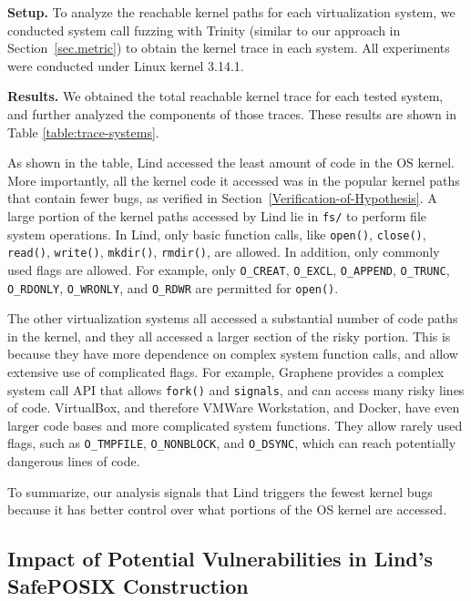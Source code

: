 {{\noindent
\textbf{Setup.}
To analyze the reachable kernel paths for each
virtualization system,
we conducted system call fuzzing with Trinity (similar to our approach in Section~{\ref{sec.metric}}) to obtain
the kernel trace in each system.
All experiments were conducted under Linux kernel 3.14.1.

\noindent
\textbf{Results.}
We obtained the total reachable kernel trace for
each tested system,
and further analyzed the components of those traces. These results
are shown in Table \ref{table:trace-systems}.

As shown in the table, Lind accessed the least amount of code in the OS
kernel. More importantly, all the kernel code it accessed was in the
popular kernel paths that contain fewer bugs,
as verified in Section~{\ref{Verification-of-Hypothesis}}.
A large portion of the kernel paths accessed by Lind lie in
\texttt{fs/} to perform file system operations.
In Lind, only basic function calls,
like \texttt{open()}, \texttt{close()}, \texttt{read()}, \texttt{write()}, \texttt{mkdir()},
\texttt{rmdir()}, are allowed. In addition, only commonly used flags are allowed. For example,
only \texttt{O\_CREAT}, \texttt{O\_EXCL}, \texttt{O\_APPEND}, \texttt{O\_TRUNC},
\texttt{O\_RDONLY}, \texttt{O\_WRONLY}, and \texttt{O\_RDWR} are permitted for \texttt{open()}.

The other virtualization systems all accessed a substantial number of code
paths in the kernel,
and they all accessed a larger section of the risky portion.
This is because they have
more dependence on complex system function calls, and
allow extensive use of complicated flags. For example,
Graphene provides a complex system call API that allows
\texttt{fork()} and \texttt{signals}, and can access many risky lines of code.
VirtualBox, and therefore VMWare Workstation, and Docker, have even larger
code bases and more complicated system functions. They allow
rarely used flags, such as \texttt{O\_TMPFILE}, \texttt{O\_NONBLOCK},
and \texttt{O\_DSYNC}, which can reach potentially dangerous lines
of code.

To summarize, our analysis signals that Lind triggers the fewest kernel bugs because
it has better control over what portions of the OS kernel are accessed.

\subsection{Impact of Potential Vulnerabilities in Lind's SafePOSIX Construction}
\label{Reachable-Kernel-Trace-Analysis-for-Repy-Sandbox}

}}
